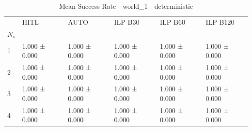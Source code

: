 \begin{table}
\caption{Mean Success Rate - world_1 - deterministic}
\label{tab:success_rate_deterministic}
\begin{tabular}{llllll}
\toprule
 & HITL & AUTO & ILP-B30 & ILP-B60 & ILP-B120 \\
$N_s$ &  &  &  &  &  \\
\midrule
1 & 1.000 ± 0.000 & 1.000 ± 0.000 & 1.000 ± 0.000 & 1.000 ± 0.000 & 1.000 ± 0.000 \\
2 & 1.000 ± 0.000 & 1.000 ± 0.000 & 1.000 ± 0.000 & 1.000 ± 0.000 & 1.000 ± 0.000 \\
3 & 1.000 ± 0.000 & 1.000 ± 0.000 & 1.000 ± 0.000 & 1.000 ± 0.000 & 1.000 ± 0.000 \\
4 & 1.000 ± 0.000 & 1.000 ± 0.000 & 1.000 ± 0.000 & 1.000 ± 0.000 & 1.000 ± 0.000 \\
\bottomrule
\end{tabular}
\end{table}
